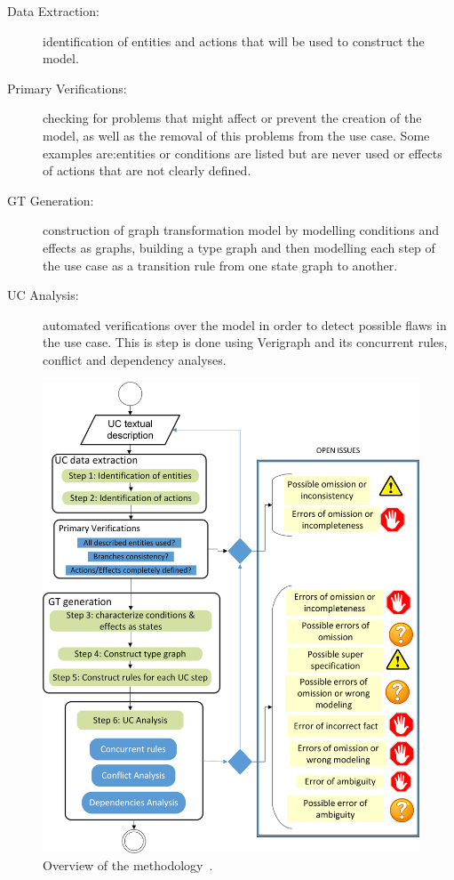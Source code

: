 \begin{description}
  \item[Data Extraction:] identification of entities and actions that will be used to construct the model.

  \item[Primary Verifications:] checking for problems that might affect or prevent the creation of the model, as well as the removal of this problems from the use case. Some examples are:entities or conditions are listed but are never used or effects of actions that are not clearly defined.

  \item[GT Generation:] construction of graph transformation model by modelling conditions and effects as graphs, building a type graph and then modelling each step of the use case as a transition rule from one state graph to another.

  \item[UC Analysis:] automated verifications over the model in order to detect possible flaws in the use case. This is step is done using Verigraph and its concurrent rules, conflict and dependency analyses.
\end{description}

\begin{figure}[!ht]
  \centering
  \includegraphics[scale=0.7]{images/generating-tests/methodology}
  \caption{Overview of the methodology~\cite{Junior2015}.}\label{fig:tests:methodology}
\end{figure}

